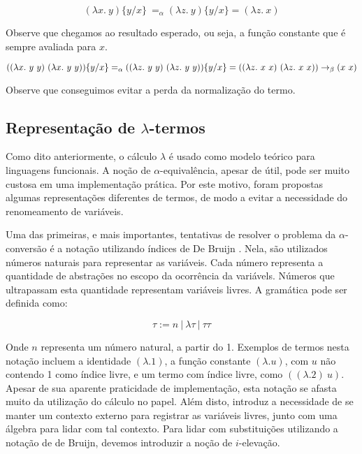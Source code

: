 \[ (\lambda x.\ y)\{y/x\}\ =_{\alpha} (\lambda z.\ y)\{y/x\} = (\lambda z.\ x) \]

Observe que chegamos ao resultado esperado, ou seja, a função constante que é
sempre avaliada para $x$.

\[ ((\lambda x.\ y\ y)\ (\lambda x.\ y\ y))\{y/x\} =_{\alpha} ((\lambda z.\ y\
    y)\ (\lambda z.\ y\ y))\{y/x\} \\
    = ((\lambda z.\ x\ x)\ (\lambda z.\ x\ x)) \rightarrow_{\beta} (x\ x)\]

Observe que conseguimos evitar a perda da normalização do termo.


\subsection{Representação de $\lambda$-termos}
\label{sub:int_lnr}

Como dito anteriormente, o cálculo $\lambda$ é usado como modelo teórico para
linguagens funcionais. A noção de $\alpha$-equivalência, apesar de útil, pode ser
muito custosa em uma implementação prática. Por este motivo, foram propostas
algumas representações diferentes de termos, de modo a evitar a necessidade do
renomeamento de variáveis. 

Uma das primeiras, e mais importantes, tentativas de resolver o problema da
$\alpha$-conversão é a notação utilizando índices de De Bruijn \cite{debruijn72}. Nela, são
utilizados números naturais para representar as variáveis. Cada número
representa a quantidade de abstrações no escopo da ocorrência da variávels.
Números que ultrapassam esta quantidade representam variáveis livres. A
gramática pode ser definida como:

\[ \tau := n\ |\ \lambda \tau\ |\ \tau \tau \]

Onde $n$ representa um número natural, a partir do 1. Exemplos de termos
nesta notação incluem a identidade $(\lambda. 1)$, a função constante $(\lambda.
u)$, com $u$ não contendo 1 como índice livre, e um termo com índice
livre, como $((\lambda.2)\ u)$. Apesar de sua aparente praticidade de
implementação, esta notação se afasta muito da utilização do cálculo no papel.
Além disto, introduz a necessidade de se manter um contexto externo para
registrar as variáveis livres, junto com uma álgebra para lidar com tal
contexto. Para lidar com substituições utilizando a notação de de Bruijn,
devemos introduzir a noção de $i$-elevação.

